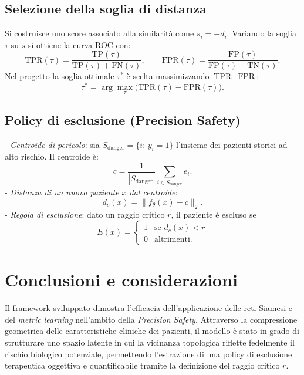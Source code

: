 \documentclass{article}
\begin{document}
\subsection*{Selezione della soglia di distanza}
Si costruisce uno score associato alla similarità come $s_i = -d_i$. Variando la soglia $\tau$ su $s$ si ottiene la curva ROC con:
$$
\text{TPR}(\tau)=\frac{\text{TP}(\tau)}{\text{TP}(\tau)+\text{FN}(\tau)},\qquad
\text{FPR}(\tau)=\frac{\text{FP}(\tau)}{\text{FP}(\tau)+\text{TN}(\tau)}.
$$
Nel progetto la soglia ottimale $\tau^*$ è scelta massimizzando $\text{TPR}-\text{FPR}$:
$$
\tau^* = \arg\max_{\tau}\big(\text{TPR}(\tau)-\text{FPR}(\tau)\big).
$$

\subsection*{Policy di esclusione (Precision Safety)}
- \textit{Centroide di pericolo}: sia $S_{\text{danger}}=\{i:\,y_i=1\}$ l'insieme dei pazienti storici ad alto rischio. Il centroide è:
$$
c = \frac{1}{|S_{\text{danger}}|}\sum_{i\in S_{\text{danger}}} e_i.
$$
- \textit{Distanza di un nuovo paziente $x$ dal centroide}:
$$
d_c(x) = \|f_{\theta}(x) - c\|_2.
$$
- \textit{Regola di esclusione}: dato un raggio critico $r$, il paziente è escluso se
$$
E(x) = \begin{cases}1 &\text{se } d_c(x) < r\\ 0 &\text{altrimenti.}\end{cases}
$$

\section{Conclusioni e considerazioni}
Il framework sviluppato dimostra l'efficacia dell'applicazione delle reti Siamesi e del \textit{metric learning} nell'ambito della \textit{Precision Safety}. Attraverso la compressione geometrica delle caratteristiche cliniche dei pazienti, il modello è stato in grado di strutturare uno spazio latente in cui la vicinanza topologica riflette fedelmente il rischio biologico potenziale, permettendo l'estrazione di una policy di esclusione terapeutica oggettiva e quantificabile tramite la definizione del raggio critico $r$.
\end{document}
